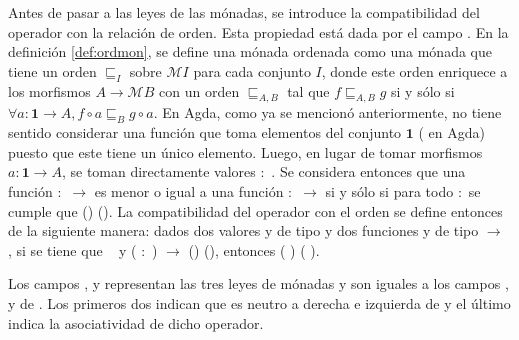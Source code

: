 Antes de pasar a las leyes de las mónadas, se introduce la compatibilidad del operador \AgdaField{$\gg=$} con la relación de orden. Esta propiedad está dada por el campo . En la definición \ref{def:ordmon}, se define una mónada ordenada como una mónada que tiene un orden $\sqsubseteq_I$ sobre $\mathcal{M} I$ para cada conjunto $I$, donde este orden enriquece a los morfismos $A \rightarrow \mathcal{M} B$ con un orden $\sqsubseteq_{A,B}$ tal que $f \sqsubseteq_{A,B} g$ si y sólo si $\forall a: \mathbf{1} \rightarrow A, f \circ a \sqsubseteq_B g \circ a$. En Agda, como ya se mencionó anteriormente, no tiene sentido considerar una función que toma elementos del conjunto $\mathbf{1}$ (\AgdaDatatype{$\top$} en Agda) puesto que este tiene un único elemento. Luego, en lugar de tomar morfismos $a : \mathbf{1} \rightarrow A$, se toman directamente valores  $:$ . Se considera entonces que una función  $:$  $\rightarrow$  es menor o igual a una función  $:$  $\rightarrow$  si y sólo si para todo  $:$  se cumple que ()  (). La compatibilidad del operador \AgdaField{$\gg=$} con el orden  se define entonces de la siguiente manera: dados dos valores  y  de tipo \hbox{} y dos funciones  y  de tipo  $\rightarrow$ , si se tiene que \hbox{  } y \AgdaSymbol{$\forall$} ( $:$ ) $\rightarrow$ ()  (), entonces ( \AgdaField{$\gg=$} )  ( \AgdaField{$\gg=$} ).

Los campos ,  y  representan las tres leyes de mónadas y son iguales a los campos ,  y  de . Los primeros dos indican que  es neutro a derecha e izquierda de \AgdaField{$\gg=$} y el último indica la asociatividad de dicho operador.

